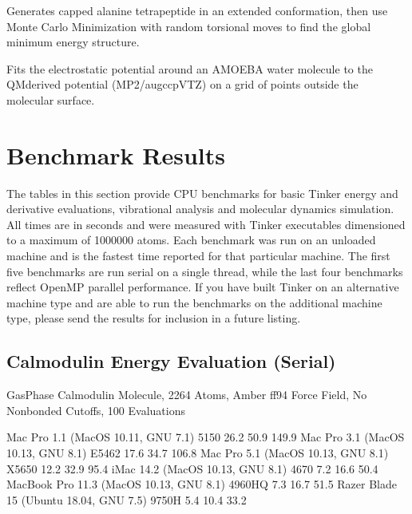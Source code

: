 \documentclass[letterpaper,11pt,english]{sphinxmanual}
\begin{document}

Generates capped alanine tetrapeptide in an extended conformation, then use Monte Carlo Minimization with random torsional moves to find the global minimum energy structure.


Fits the electrostatic potential around an AMOEBA water molecule to the QM\sphinxhyphen{}derived potential (MP2/aug\sphinxhyphen{}cc\sphinxhyphen{}pVTZ) on a grid of points outside the molecular surface.


\chapter{Benchmark Results}
\label{\detokenize{text/benchmarks:benchmark-results}}\label{\detokenize{text/benchmarks::doc}}
The tables in this section provide CPU benchmarks for basic Tinker energy and derivative evaluations, vibrational analysis and molecular dynamics simulation. All times are in seconds and were measured with Tinker executables dimensioned to a maximum of 1000000 atoms. Each benchmark was run on an unloaded machine and is the fastest time reported for that particular machine. The first five benchmarks are run serial on a single thread, while the last four benchmarks reflect OpenMP parallel performance. If you have built Tinker on an alternative machine type and are able to run the benchmarks on the additional machine type, please send the results for inclusion in a future listing.


\section{Calmodulin Energy Evaluation (Serial)}
\label{\detokenize{text/benchmarks:calmodulin-energy-evaluation-serial}}
Gas\sphinxhyphen{}Phase Calmodulin Molecule, 2264 Atoms, Amber ff94 Force Field, No Nonbonded Cutoffs, 100 Evaluations


\begin{sphinxVerbatim}[commandchars=\\\{\}]
Mac Pro 1.1 (MacOS 10.11, GNU 7.1)             5150        26.2         50.9       149.9
Mac Pro 3.1 (MacOS 10.13, GNU 8.1)            E5462        17.6         34.7       106.8
Mac Pro 5.1 (MacOS 10.13, GNU 8.1)            X5650        12.2         32.9        95.4
iMac 14.2 (MacOS 10.13, GNU 8.1)               4670         7.2         16.6        50.4
MacBook Pro 11.3 (MacOS 10.13, GNU 8.1)      4960HQ         7.3         16.7        51.5
Razer Blade 15 (Ubuntu 18.04, GNU 7.5)        9750H         5.4         10.4        33.2
\end{sphinxVerbatim}
\end{document}
